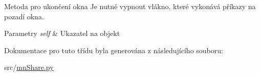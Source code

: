 Metoda pro ukončení okna Je nutné vypnout vlákno, které vykonává příkazy na pozadí okna. 


\begin{DoxyParams}{Parametry}
{\em self} & Ukazatel na objekt \\
\hline
\end{DoxyParams}


Dokumentace pro tuto třídu byla generována z následujícího souboru\-:\begin{DoxyCompactItemize}
\item 
src/\hyperlink{mnShare_8py}{mn\-Share.\-py}\end{DoxyCompactItemize}
